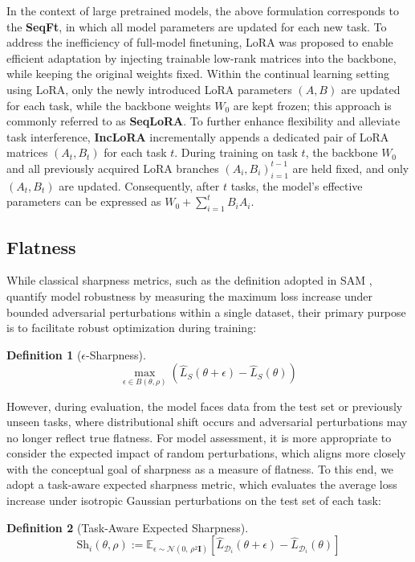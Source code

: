 \documentclass[letterpaper]{article} %
\newtheorem{definition}{Definition}
\begin{document}
In the context of large pretrained models, the above formulation corresponds to the \textbf{SeqFt}, in which all model parameters are updated for each new task. To address the inefficiency of full-model finetuning, LoRA was proposed to enable efficient adaptation by injecting trainable low-rank matrices into the backbone, while keeping the original weights fixed. Within the continual learning setting using LoRA, only the newly introduced LoRA parameters $(A, B)$ are updated for each task, while the backbone weights $W_0$ are kept frozen; this approach is commonly referred to as \textbf{SeqLoRA}. To further enhance flexibility and alleviate task interference, \textbf{IncLoRA} incrementally appends a dedicated pair of LoRA matrices $(A_t, B_t)$ for each task $t$. During training on task $t$, the backbone $W_0$ and all previously acquired LoRA branches ${(A_i, B_i)}_{i=1}^{t-1}$ are held fixed, and only $(A_t, B_t)$ are updated. Consequently, after $t$ tasks, the model’s effective parameters can be expressed as $W_0 + \sum_{i=1}^{t} B_i A_i$.



\subsection{Flatness}

While classical sharpness metrics, such as the definition adopted in SAM , quantify model robustness by measuring the maximum loss increase under bounded adversarial perturbations within a single dataset, their primary purpose is to facilitate robust optimization during training:
 \begin{definition}[$\epsilon$-Sharpness]
 \begin{equation}
 \max_{\epsilon \in B(\theta, \rho)}\left(\hat{L}_{S}(\theta+\epsilon)-\hat{L}_{S}(\theta)\right)
 \end{equation}
 \end{definition}
However, during evaluation, the model faces data from the test set or previously unseen tasks, where distributional shift occurs and adversarial perturbations may no longer reflect true flatness. For model assessment, it is more appropriate to consider the expected impact of random perturbations, which aligns more closely with the conceptual goal of sharpness as a measure of flatness. To this end, we adopt a task-aware expected sharpness metric, which evaluates the average loss increase under isotropic Gaussian perturbations on the test set of each task:
 \begin{definition}[Task-Aware Expected Sharpness]\label{def: Task-Aware Expected Sharpness}
 \begin{equation}
 \mathrm{Sh}_{ i}(\theta,\rho) := \mathbb{E}_{\epsilon \sim \mathcal{N}(0,\, \rho^2 \mathbf{I})}  \left[ \hat{L}_{\mathcal{D}_{i}}(\theta + \epsilon) - \hat{L}_{\mathcal{D}_{i}}(\theta) \right]
 \end{equation}
 \end{definition}
 
\end{document}
